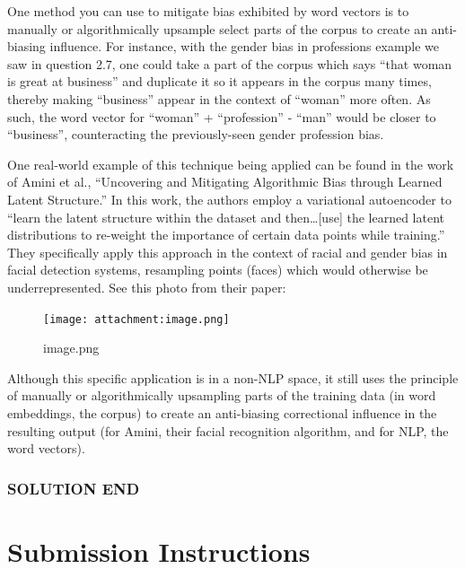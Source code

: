 \documentclass[11pt]{article}
\begin{document}
One method you can use to mitigate bias exhibited by word vectors is to
manually or algorithmically upsample select parts of the corpus to
create an anti-biasing influence. For instance, with the gender bias in
professions example we saw in question 2.7, one could take a part of the
corpus which says ``that woman is great at business'' and duplicate it
so it appears in the corpus many times, thereby making ``business''
appear in the context of ``woman'' more often. As such, the word vector
for ``woman'' + ``profession'' - ``man'' would be closer to
``business'', counteracting the previously-seen gender profession bias.

One real-world example of this technique being applied can be found in
the work of Amini et al., ``Uncovering and Mitigating Algorithmic Bias
through Learned Latent Structure.'' In this work, the authors employ a
variational autoencoder to ``learn the latent structure within the
dataset and then\ldots{[}use{]} the learned latent distributions to
re-weight the importance of certain data points while training.'' They
specifically apply this approach in the context of racial and gender
bias in facial detection systems, resampling points (faces) which would
otherwise be underrepresented. See this photo from their paper:

\begin{figure}
\centering
\texttt{[image: attachment:image.png]}
\caption{image.png}
\end{figure}

Although this specific application is in a non-NLP space, it still uses
the principle of manually or algorithmically upsampling parts of the
training data (in word embeddings, the corpus) to create an anti-biasing
correctional influence in the resulting output (for Amini, their facial
recognition algorithm, and for NLP, the word vectors).

\hypertarget{solution-end}{%
\subsubsection{SOLUTION END}\label{solution-end}}

    \hypertarget{submission-instructions}{%
\section{\texorpdfstring{ Submission
Instructions}{ Submission Instructions}}\label{submission-instructions}}
\end{document}
